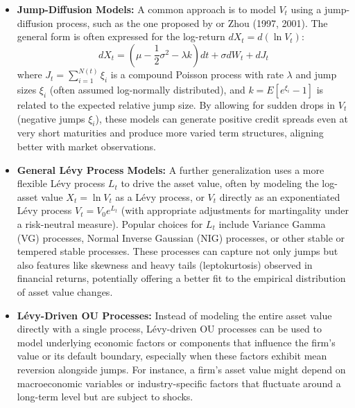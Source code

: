 \documentclass[11pt,twoside,openright]{report}
\begin{document}
\begin{itemize}
    \item \textbf{Jump-Diffusion Models:} A common approach is to model $V_t$ using a jump-diffusion process, such as the one proposed by \cite{merton1976option} or Zhou (1997, 2001). The general form is often expressed for the log-return $dX_t = d(\ln V_t)$:
    \begin{equation}
    dX_t = (\mu - \frac{1}{2}\sigma^2 - \lambda k)dt + \sigma dW_t + dJ_t
    \label{eq:jump_diffusion}
    \end{equation}
    where $J_t = \sum_{i=1}^{N(t)} \xi_i$ is a compound Poisson process with rate $\lambda$ and jump sizes $\xi_i$ (often assumed log-normally distributed), and $k = E[e^{\xi_i} - 1]$ is related to the expected relative jump size. By allowing for sudden drops in $V_t$ (negative jumps $\xi_i$), these models can generate positive credit spreads even at very short maturities and produce more varied term structures, aligning better with market observations.

    \item \textbf{General Lévy Process Models:} A further generalization uses a more flexible Lévy process $L_t$ to drive the asset value, often by modeling the log-asset value $X_t = \ln V_t$ as a Lévy process, or $V_t$ directly as an exponentiated Lévy process $V_t = V_0 e^{L_t}$ (with appropriate adjustments for martingality under a risk-neutral measure). Popular choices for $L_t$ include Variance Gamma (VG) processes, Normal Inverse Gaussian (NIG) processes, or other stable or tempered stable processes. These processes can capture not only jumps but also features like skewness and heavy tails (leptokurtosis) observed in financial returns, potentially offering a better fit to the empirical distribution of asset value changes.

    \item \textbf{Lévy-Driven OU Processes:} Instead of modeling the entire asset value directly with a single process, Lévy-driven OU processes can be used to model underlying economic factors or components that influence the firm's value or its default boundary, especially when these factors exhibit mean reversion alongside jumps. For instance, a firm's asset value might depend on macroeconomic variables or industry-specific factors that fluctuate around a long-term level but are subject to shocks.
\end{itemize}
\end{document}
